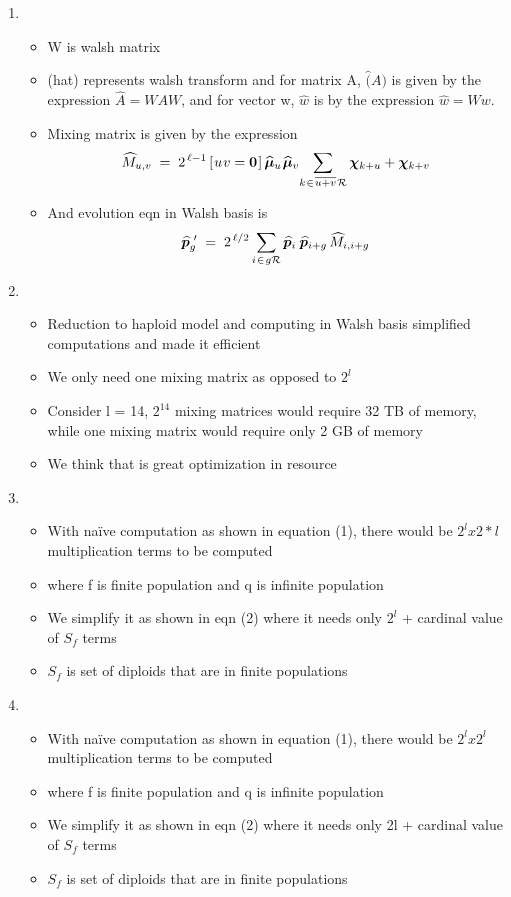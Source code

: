 \documentclass{article}
\newcommand{\nudge}{\hspace{0.01in}}
\begin{document}
\begin{enumerate}
\item
  \begin{itemize}
  \item W is walsh matrix
  \item (hat) represents walsh transform and for matrix A, $\hat(A)$
    is given by the expression $\widehat{A} = WAW$, and for vector w, $\hat{w}$ is 
    by the expression $\widehat{w} = Ww$.
  \item Mixing matrix is given by the expression
    \[
	  \widehat{M}_{u,v} \; = \; 2^{\,\ell-1} \,[\nudge u \nudge v = {\bf
	  0}\nudge]\, \widehat{\bm{\mu}}_u \nudge \widehat{\bm{\mu}}_v \!  \sum_{k
	\nudge \in \nudge \overline{u+v} \nudge \mathcal{R}} \bm{\chi}_{k + u} +
	\bm{\chi}_{k + v}
	\]
  \item And evolution eqn in Walsh basis is 
  \[
	  \widehat{\bm{p}}_g^{\,\,\prime} \; = \; 2^{\,\ell/2} \sum_{i \nudge \in \nudge g \mathcal{R}}
	  \widehat{\bm{p}}_i \, \nudge \widehat{\bm{p}}_{i+g} \,\widehat{M}_{i,i+g}
	\]
  \end{itemize}
    
\item
  \begin{itemize}
  \item Reduction to haploid model and computing in Walsh basis
    simplified computations and made it efficient
  \item We only need one mixing matrix as opposed to $2^l$
  \item Consider l = 14, $2^14$ mixing matrices would require 32 TB of
    memory, while one mixing matrix would require only 2 GB of memory
  \item We think that is great optimization in resource
  \end{itemize}
    
\item
  \begin{itemize}
  \item With naïve computation as shown in equation (1), there would
    be $2^l x 2*l$ multiplication terms to be computed
  \item where f is finite population and q is infinite population
  \item We simplify it as shown in eqn (2) where it needs only $2^l$ +
    cardinal value of $S_f$ terms
  \item $S_f$ is set of diploids that are in finite populations
  \end{itemize}
    
\item
  \begin{itemize}
  \item With naïve computation as shown in equation (1), there would
    be $2^l x 2^l$ multiplication terms to be computed
  \item where f is finite population and q is infinite population
  \item We simplify it as shown in eqn (2) where it needs only 2l +
    cardinal value of $S_f$ terms
  \item $S_f$ is set of diploids that are in finite populations
  \end{itemize}


\end{enumerate}
\end{document}
